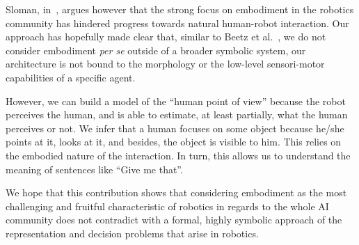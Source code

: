 Sloman, in~\cite{Sloman2009}, argues however that the strong focus on
embodiment in the robotics community has hindered progress towards natural
human-robot interaction. Our approach has hopefully made clear that, similar to
Beetz et al.~\cite{Beetz2010}, we do not consider embodiment \emph{per se}
outside of a broader symbolic system, \ie our architecture is not bound to the
morphology or the low-level sensori-motor capabilities of a specific agent. 

However, we can build a model of the ``human point of view'' because the robot
perceives the human, and is able to estimate, at least partially, what the
human perceives or not. We infer that a human focuses on some object because
he/she points at it, looks at it, and besides, the object is visible to him.
This relies on the embodied nature of the interaction. In turn, this allows us
to understand the meaning of sentences like ``Give me that''.

We hope that this contribution shows that considering embodiment as the most
challenging and fruitful characteristic of robotics in regards to the whole AI
community does not contradict with a formal, highly symbolic approach of the
representation and decision problems that arise in robotics. 

